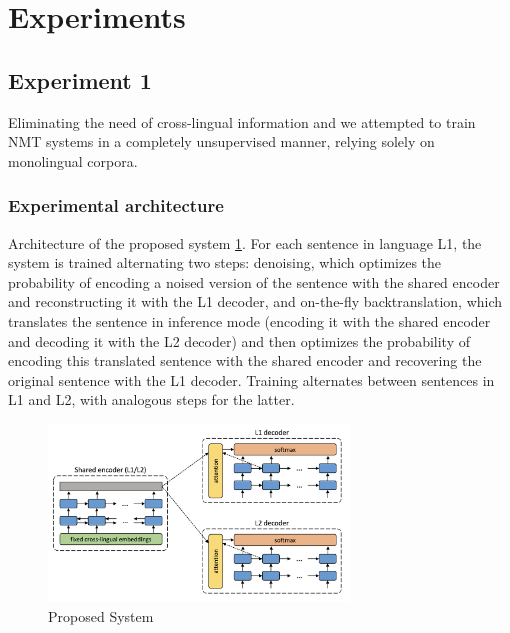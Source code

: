 \section{Experiments} \label{sec: experiments}



\subsection{Experiment 1}
 Eliminating the need of cross-lingual information and we attempted to train NMT systems in a completely unsupervised manner, relying solely on monolingual corpora.


\subsubsection{Experimental architecture}
Architecture of the proposed system \ref{unsupervised_NMT}. For each sentence in language L1, the system is trained alternating two steps: denoising, which optimizes the probability of encoding a noised version of the sentence with the shared encoder and reconstructing it with the L1 decoder, and on-the-fly backtranslation, which translates the sentence in inference mode (encoding it with the shared encoder and decoding it with the L2 decoder) and then optimizes the probability of encoding this translated sentence with the shared encoder and recovering the original sentence with the L1 decoder. Training alternates between sentences in L1 and L2, with analogous steps for the latter.

 \begin{figure} [h]
    \center
    \includegraphics[width=8cm]{Figures/unsup_nmt.png}  
    \caption{Proposed System}
    \label{unsupervised_NMT}
\end{figure}

